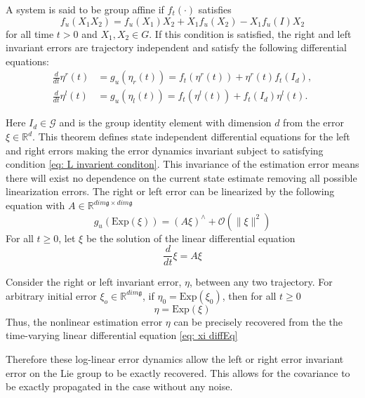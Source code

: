 \begin{theorem}
A system is said to be group affine if $f_t(\cdot)$ satisfies
\begin{equation}
    f_u(X_1 X_2) = f_u(X_1) X_2 + X_1 f_u(X_2) - X_1 f_u(I) X_2
    \label{eq: L invarient conditon}
\end{equation}
for all time $t > 0$ and $X_1, X_2 \in G$. If this condition is satisfied, the right and left invariant errors are trajectory independent and satisfy the following differential equations:
\begin{align}
    \frac{d}{dt} \eta^r(t) &= g_u(\eta_r(t)) = f_t(\eta^r(t)) + \eta^r(t) f_t(I_d), \\
    \frac{d}{dt} \eta^l(t) &= g_u(\eta_l(t)) = f_t(\eta^l(t)) + f_t(I_d) \eta^l(t).
\end{align}
\end{theorem}
Here $I_d \in \mathcal{G}$ and is the group identity element with dimension $d$ from the error $\xi \in \mathbb{R}^d$. This theorem defines state independent differential equations for the left and right errors making the error dynamics invariant subject to satisfying condition \eqref{eq: L invarient conditon}. This invariance of the estimation error means there will exist no dependence on the current state estimate removing all possible linearization errors. The right or left error can be linearized by the following equation with $A \in \mathbb{R}^{dim \mathfrak{g} \times dim \mathfrak{g}}$\cite{Contact-Aided_Invarant_EKF}
\begin{equation}
    g_u(\text{Exp}(\xi)) = (A \xi)^{\wedge} + \mathcal{O}(\|\xi\|^2)
    \label{eq: Linearization InEKF}
\end{equation}
For all $t \ge 0$, let $\xi$ be the solution of the linear differential equation \cite{Contact-Aided_Invarant_EKF}
\begin{equation}
    \frac{d}{dt} \xi = A \xi 
    \label{eq: xi diffEq}
\end{equation}
\begin{theorem}
\label{th: Log-Linear Property of Error}
Consider the right or left invariant error, $\eta$, between any two trajectory. For arbitrary initial error $\xi_o \in \mathbb{R}^{dim \mathfrak{g}}$, if $\eta_0 = \text{Exp}(\xi_0)$, then for all $t \ge 0$
\begin{equation}
    \eta = \text{Exp}(\xi)
    \label{eq: eta to exp xi}
\end{equation}
Thus, the nonlinear estimation error $\eta$ can be precisely recovered from the the time-varying linear differential equation \eqref{eq: xi diffEq}
\end{theorem}
Therefore these log-linear error dynamics allow the left or right error invariant error on the Lie group to be exactly recovered. This allows for the covariance to be exactly propagated in the case without any noise.

